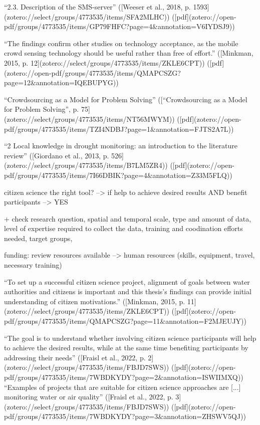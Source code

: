 {“2.3. Description of the SMS-server” ([Weeser et al., 2018, p. 1593](zotero://select/groups/4773535/items/SFA2MLHC)) ([pdf](zotero://open-pdf/groups/4773535/items/GP79FHFC?page=4&annotation=V6IYDSJ9))

“The findings confirm other studies on technology acceptance, as the mobile crowd sensing technology should be useful rather than free of effort.” ([Minkman, 2015, p. 12](zotero://select/groups/4773535/items/ZKLE6CPT)) ([pdf](zotero://open-pdf/groups/4773535/items/QMAPCSZG?page=12&annotation=IQEBUPYG))


“Crowdsourcing as a Model for Problem Solving” ([“Crowdsourcing as a Model for Problem Solving”, p. 75](zotero://select/groups/4773535/items/NT56MWYM)) ([pdf](zotero://open-pdf/groups/4773535/items/TZI4NDBJ?page=1&annotation=FJTS2A7L))

“2 Local knowledge in drought monitoring: an introduction to the literature review” ([Giordano et al., 2013, p. 526](zotero://select/groups/4773535/items/B7LM5ZR4)) ([pdf](zotero://open-pdf/groups/4773535/items/7I66DBIK?page=4&annotation=Z33M5FLQ))

citizen science the right tool?
--> if help to achieve desired results AND benefit participants --> YES

+ check research question, spatial and temporal scale, type and amount of data, level of expertise required to collect the data, training and coodination efforts needed, target groups, 

funding: review resources available --> human resources (skills, equipment, travel, necessary training)

“To set up a successful citizen science project, alignment of goals between water authorities and citizens is important and this thesis’s findings can provide initial understanding of citizen motivations.” ([Minkman, 2015, p. 11](zotero://select/groups/4773535/items/ZKLE6CPT)) ([pdf](zotero://open-pdf/groups/4773535/items/QMAPCSZG?page=11&annotation=F2MJEUJY))
% 

“The goal is to understand whether involving citizen science participants will help to achieve the desired results, while at the same time benefiting participants by addressing their needs” ([Fraisl et al., 2022, p. 2](zotero://select/groups/4773535/items/FBJD7SWS)) ([pdf](zotero://open-pdf/groups/4773535/items/7WBDKYDY?page=2&annotation=ISWIIMXQ))
“Examples of projects that are suitable for citizen science approaches are [...] monitoring water or air quality” ([Fraisl et al., 2022, p. 3](zotero://select/groups/4773535/items/FBJD7SWS)) ([pdf](zotero://open-pdf/groups/4773535/items/7WBDKYDY?page=3&annotation=ZHSWV5QJ))

}
